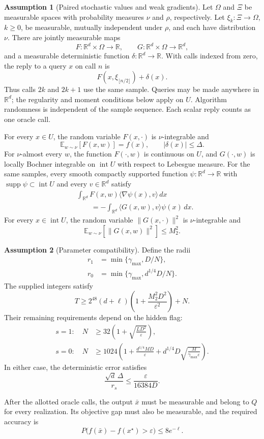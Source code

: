 \documentclass[10pt]{article}
\theoremstyle{definition}
\newtheorem{assumption}{Assumption}
\begin{document}
\begin{assumption}[Paired stochastic values and weak gradients]
Let $\Omega$ and $\Xi$ be measurable spaces with probability measures $\nu$ and $\rho$, respectively. Let $\xi_k:\Xi\to\Omega$, $k\geq0$, be measurable, mutually independent under $\rho$, and each have distribution $\nu$. There are jointly measurable maps
\[
F:\mathbb{R}^d\times\Omega\to\mathbb{R},
\qquad
G:\mathbb{R}^d\times\Omega\to\mathbb{R}^d,
\]
and a measurable deterministic function $\delta:\mathbb{R}^d\to\mathbb{R}$. With calls indexed from zero, the reply to a query $x$ on call $n$ is
\[
F(x,\xi_{\lfloor n/2\rfloor})+\delta(x).
\]
Thus calls $2k$ and $2k+1$ use the same sample. Queries may be made anywhere in $\mathbb{R}^d$; the regularity and moment conditions below apply on $U$. Algorithm randomness is independent of the sample sequence. Each scalar reply counts as one oracle call.

For every $x\in U$, the random variable $F(x,\cdot)$ is $\nu$-integrable and
\[
\mathbb{E}_{w\sim\nu}[F(x,w)]=f(x),
\qquad |\delta(x)|\leq\Delta.
\]
For $\nu$-almost every $w$, the function $F(\cdot,w)$ is continuous on $U$, and $G(\cdot,w)$ is locally Bochner integrable on $\operatorname{int}U$ with respect to Lebesgue measure. For the same samples, every smooth compactly supported function $\psi:\mathbb{R}^d\to\mathbb{R}$ with $\operatorname{supp}\psi\subset\operatorname{int}U$ and every $v\in\mathbb{R}^d$ satisfy
\[
\begin{aligned}
&\int_{\mathbb{R}^d}F(x,w)\langle\nabla\psi(x),v\rangle\,dx\\
&\qquad=-\int_{\mathbb{R}^d}\langle G(x,w),v\rangle\psi(x)\,dx.
\end{aligned}
\]
For every $x\in\operatorname{int}U$, the random variable $\|G(x,\cdot)\|^2$ is $\nu$-integrable and
\[
\mathbb{E}_{w\sim\nu}[\|G(x,w)\|^2]\leq M_2^2.
\]
\end{assumption}

\begin{assumption}[Parameter compatibility]
Define the radii
\[
\begin{aligned}
r_1&=\min\{\gamma_{\max},D/N\},\\
r_0&=\min\{\gamma_{\max},d^{1/4}D/N\}.
\end{aligned}
\]
The supplied integers satisfy
\[
T\geq 2^{48}(d+\ell)
\left(1+\frac{M_2^2D^2}{\varepsilon^2}\right)+N.
\]
Their remaining requirements depend on the hidden flag:
\[
\begin{aligned}
s=1:\quad
N&\geq32\left(1+\sqrt{\frac{LD^2}{\varepsilon}}\right),\\
s=0:\quad
N&\geq1024\left(1+\frac{d^{1/4}MD}{\varepsilon}
+d^{1/4}D\sqrt{\frac{M}{\gamma_{\max}\varepsilon}}\right).
\end{aligned}
\]
In either case, the deterministic error satisfies
\[
\frac{\sqrt d\,\Delta}{r_s}
\leq\frac{\varepsilon}{16384D}.
\]
\end{assumption}

After the allotted oracle calls, the output $\bar{x}$ must be measurable and belong to $Q$ for every realization. Its objective gap must also be measurable, and the required accuracy is
\[
P\bigl(f(\bar{x})-f(x^\star)>\varepsilon\bigr)
\leq8e^{-\ell}.
\]
\end{document}
